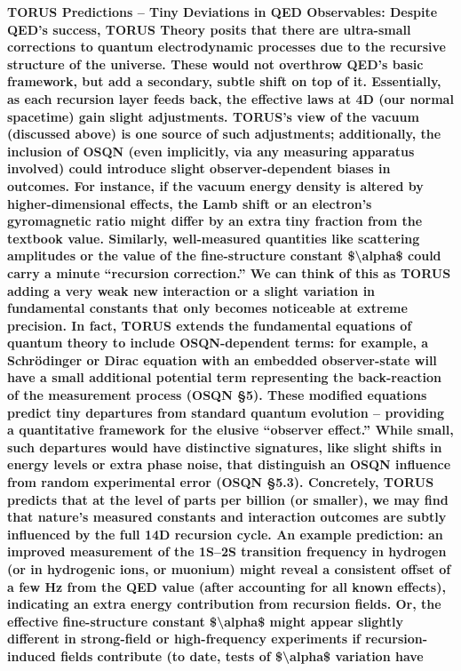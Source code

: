 \documentclass[
]{article}
\begin{document}
\textbf{TORUS Predictions -- Tiny Deviations in QED Observables: Despite
QED's success, TORUS Theory posits that there are ultra-small
corrections to quantum electrodynamic processes due to the recursive
structure of the universe. These would not overthrow QED's basic
framework, but add a secondary, subtle shift on top of it. Essentially,
as each recursion layer feeds back, the effective laws at 4D (our normal
spacetime) gain slight adjustments. TORUS's view of the vacuum
(discussed above) is one source of such adjustments; additionally, the
inclusion of OSQN (even implicitly, via any measuring apparatus
involved) could introduce slight observer-dependent biases in outcomes.
For instance, if the vacuum energy density is altered by
higher-dimensional effects, the Lamb shift or an electron's gyromagnetic
ratio might differ by an extra tiny fraction from the textbook value.
Similarly, well-measured quantities like scattering amplitudes or the
value of the fine-structure constant \$\textbackslash alpha\$ could
carry a minute ``recursion correction.'' We can think of this as TORUS
adding a very weak new interaction or a slight variation in fundamental
constants that only becomes noticeable at extreme precision. In fact,
TORUS extends the fundamental equations of quantum theory to include
OSQN-dependent terms: for example, a Schrödinger or Dirac equation with
an embedded observer-state will have a small additional potential term
representing the back-reaction of the measurement process (OSQN §5).
These modified equations predict tiny departures from standard quantum
evolution -- providing a quantitative framework for the elusive
``observer effect.'' While small, such departures would have distinctive
signatures, like slight shifts in energy levels or extra phase noise,
that distinguish an OSQN influence from random experimental error (OSQN
§5.3). Concretely, TORUS predicts that at the level of parts per billion
(or smaller), we may find that nature's measured constants and
interaction outcomes are subtly influenced by the full 14D recursion
cycle. An example prediction: an improved measurement of the 1S--2S
transition frequency in hydrogen (or in hydrogenic ions, or muonium)
might reveal a consistent offset of a few Hz from the QED value (after
accounting for all known effects), indicating an extra energy
contribution from recursion fields. Or, the effective fine-structure
constant \$\textbackslash alpha\$ might appear slightly different in
strong-field or high-frequency experiments if recursion-induced fields
contribute (to date, tests of \$\textbackslash alpha\$ variation have
}
\end{document}
